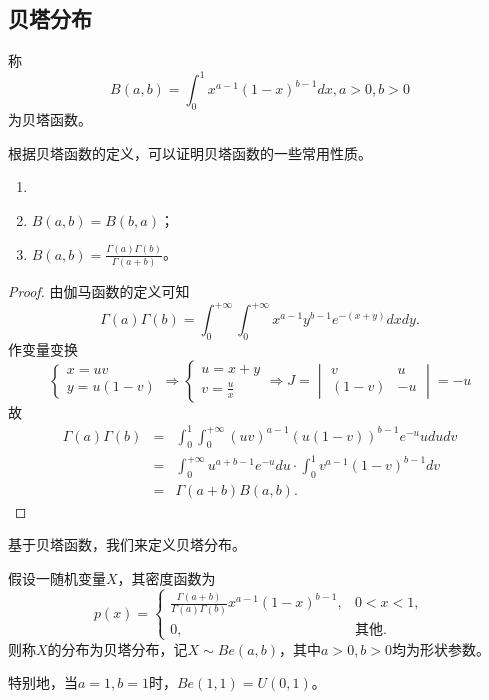 \subsection{贝塔分布}
\begin{definition}
    称
    $$B(a,b)=\int_{0}^{1} x^{a-1} (1-x)^{b-1} dx,a>0,b>0$$
    为贝塔函数。
\end{definition}
根据贝塔函数的定义，可以证明贝塔函数的一些常用性质。
 \begin{property}
    \begin{enumerate}
        \item  \item $B(a,b)=B(b,a)$；
        \item $B(a,b)=\frac{\Gamma (a)\Gamma (b)}{\Gamma (a+b)} $。
    \end{enumerate}
    \end{property}
    \begin{proof}
    由伽马函数的定义可知$$\Gamma (a)\Gamma (b)=\int_{0}^{+\infty } \int_{0}^{+\infty } x^{a-1} y^{b-1} e^{-(x+y)} dxdy.$$
    作变量变换$$\left\{\begin{matrix}
    x=uv\\
    y=u(1-v)
    \end{matrix}\right.\Longrightarrow 
    \left\{\begin{matrix}
    u=x+y\\
    v=\frac{u}{x} 
    \end{matrix}\right.\Longrightarrow
    J=\begin{vmatrix}
    v&u \\
    (1-v)&-u
    \end{vmatrix}=-u$$故
    \begin{eqnarray*}
         \Gamma (a)\Gamma (b)
       &=&\int_{0}^{1 } \int_{0}^{+\infty } (uv)^{a-1} (u(1-v))^{b-1} e^{-u} ududv\\
       &=& \int_{0}^{+\infty } u^{a+b-1}e^{-u}du  \cdot \int_{0}^{1 }v^{a-1}(1-v)^{b-1}dv\\
       &=&\Gamma (a+b)B(a,b).
    \end{eqnarray*}
    \end{proof} 
    基于贝塔函数，我们来定义贝塔分布。
   \begin{definition}
       假设一随机变量$X$，其密度函数为$$p(x)=\left\{\begin{matrix}
    \frac{\Gamma (a+b)}{\Gamma (a)\Gamma (b)}x^{a-1} (1-x)^{b-1},  &0<x<1, \\
    0,& \text{其他}.
    \end{matrix}\right.$$
    则称$X$的分布为贝塔分布，记$X\sim Be(a,b)$，其中$a>0,b>0$均为形状参数。
   \end{definition}
   \begin{remark}
       特别地，当$a=1,b=1$时，$Be(1,1) = U(0,1)$。
   \end{remark}
